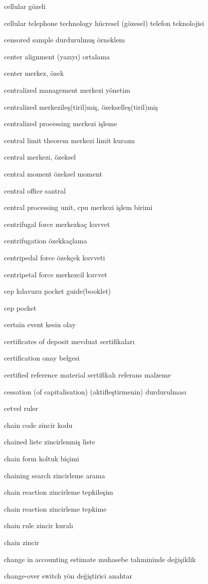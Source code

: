 \documentclass[12pt,fleqn]{article}\usepackage{../../common}
\begin{document}
cellular gözeli

cellular telephone technology hücresel (gözesel) telefon teknolojisi

censored sample durdurulmuş örneklem

center alignment (yazıyı) ortalama

center merkez, özek

centralized management merkezi yönetim

centralized merkezileş(tiril)miş, özekselleş(tiril)miş

centralized processing merkezi işleme

central limit theorem merkezi limit kuramı

central merkezi, özeksel

central moment özeksel moment

central office santral

central processing unit, cpu merkezi işlem birimi

centrifugal force merkezkaç kuvvet

centrifugation özekkaçlama

centripedal force özekçek kuvveti

centripetal force merkezcil kuvvet

cep kılavuzu pocket guide(booklet)

cep pocket

certain event kesin olay

certificates of deposit mevduat sertifikaları

certification onay belgesi

certified reference material sertifikalı referans malzeme

cessation (of capitalisation) (aktifleştirmenin) durdurulması

cetvel ruler

chain code zincir kodu

chained liste zincirlenmiş liste

chain form koltuk biçimi

chaining search zincirleme arama

chain reaction zincirleme tepkileşim

chain reaction zincirleme tepkime

chain rule zincir kuralı

chain zincir

change in accounting estimate muhasebe tahmininde değişiklik

change-over switch yön değiştirici anahtar
\end{document}
